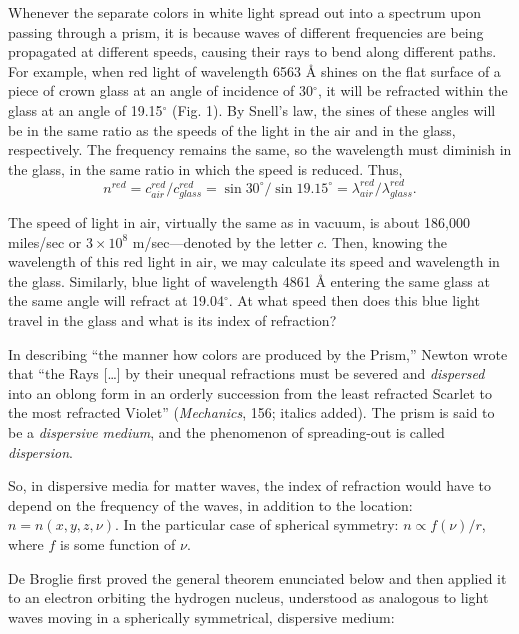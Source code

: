 Whenever the separate colors in white light spread out into a spectrum
upon passing through a prism, it is because waves of different
frequencies are being propagated at different speeds, causing their rays
to bend along different paths. For example, when red light of wavelength
6563 Å shines on the flat surface of a piece of crown glass at an angle
of incidence of 30$^{\circ}$, it will be refracted within the glass at an angle
of 19.15$^{\circ}$ (Fig. 1). By Snell's law, the sines of these angles will be in
the same ratio as the speeds of the light in the air and in the glass,
respectively. The frequency remains the same, so the wavelength must
diminish in the glass, in the same ratio in which the speed is reduced.
Thus,
\begin{equation*}
n^{red} = c^{red}_{air}/c^{red}_{glass}=\sin 30^{\circ}/\sin 19.15^{\circ}
= \lambda^{red}_{air}/\lambda^{red}_{glass}.
\end{equation*}

The speed of light in air, virtually the same as in vacuum, is about
186,000 miles/sec or $3\!\times\!10^{8}$ m/sec---denoted by the letter $c$.
Then, knowing the wavelength of this red light in air, we may calculate
its speed and wavelength in the glass. Similarly, blue light of
wavelength 4861 Å entering the same glass at the same angle will refract
at 19.04$^{\circ}$. At what speed then does this blue light travel in the glass
and what is its index of refraction?

In describing ``the manner how colors are produced by the Prism,''
Newton wrote that ``the Rays [\ldots] by their unequal refractions must be
severed and \emph{dispersed} into an oblong form in an orderly
succession from the least refracted Scarlet to the most refracted
Violet'' (\emph{Mechanics}, 156; italics added). The prism is said to
be a \emph{dispersive medium}, and the phenomenon of spreading-out is
called \emph{dispersion}.

So, in dispersive media for matter waves, the index of refraction would
have to depend on the frequency of the waves, in addition to the
location: $n = n(x,y,z,\nu)$. In the particular case of
spherical symmetry: $n \propto f(\nu)/r$, where
$f$ is some function of $\nu$.

De Broglie first proved the general theorem enunciated below and then
applied it to an electron orbiting the hydrogen nucleus, understood as
analogous to light waves moving in a spherically symmetrical, dispersive
medium:

